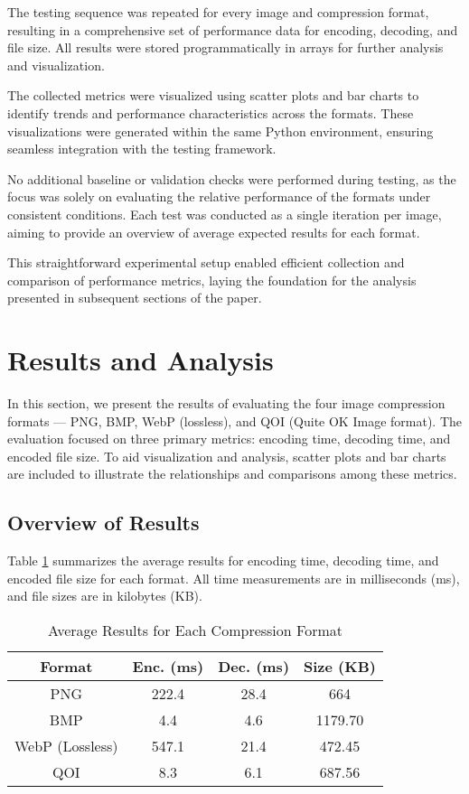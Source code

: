 \documentclass[conference]{IEEEtran}
\begin{document}
The testing sequence was repeated for every image and compression format, resulting in a comprehensive set of performance data for encoding, decoding, and file size. All results were stored programmatically in arrays for further analysis and visualization.

The collected metrics were visualized using scatter plots and bar charts to identify trends and performance characteristics across the formats. These visualizations were generated within the same Python environment, ensuring seamless integration with the testing framework.

No additional baseline or validation checks were performed during testing, as the focus was solely on evaluating the relative performance of the formats under consistent conditions. Each test was conducted as a single iteration per image, aiming to provide an overview of average expected results for each format.

This straightforward experimental setup enabled efficient collection and comparison of performance metrics, laying the foundation for the analysis presented in subsequent sections of the paper.






\section{Results and Analysis}

In this section, we present the results of evaluating the four image compression formats --- PNG, BMP, WebP (lossless), and QOI (Quite OK Image format). The evaluation focused on three primary metrics: encoding time, decoding time, and encoded file size. To aid visualization and analysis, scatter plots and bar charts are included to illustrate the relationships and comparisons among these metrics. 

\subsection{Overview of Results}

Table \ref{tab:results} summarizes the average results for encoding time, decoding time, and encoded file size for each format. All time measurements are in milliseconds (ms), and file sizes are in kilobytes (KB).

\begin{table}[htbp]
    \centering
    \caption{Average Results for Each Compression Format}
    \label{tab:results}
    \begin{tabular}{|c|c|c|c|}
        \hline
        \textbf{Format} & \textbf{Enc. (ms)} & \textbf{Dec. (ms)} & \textbf{Size (KB)} \\
        \hline
        PNG & 222.4 & 28.4 & 664 \\
        \hline
        BMP & 4.4 & 4.6 & 1179.70 \\
        \hline
        WebP (Lossless) & 547.1 & 21.4 & 472.45 \\
        \hline
        QOI & 8.3 & 6.1 & 687.56 \\
        \hline
    \end{tabular}
\end{table}
\end{document}
